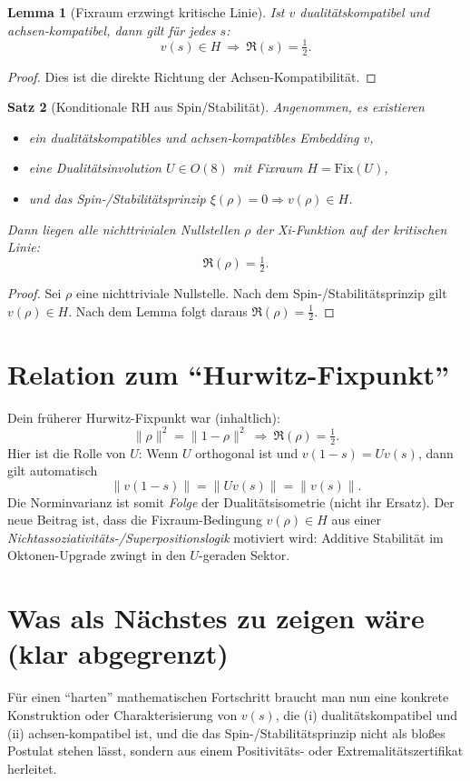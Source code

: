 \documentclass[11pt,a4paper]{article}
\newtheorem{satz}{Satz}
\newtheorem{lemma}[satz]{Lemma}
\theoremstyle{definition}
\theoremstyle{remark}
\begin{document}
	\begin{lemma}[Fixraum erzwingt kritische Linie]
		Ist $v$ dualitätskompatibel und achsen-kompatibel, dann gilt für jedes $s$:
		\[
		v(s)\in H\ \Rightarrow\ \Re(s)=\tfrac12.
		\]
	\end{lemma}
	
	\begin{proof}
		Dies ist die direkte Richtung der Achsen-Kompatibilität.
	\end{proof}
	
	\begin{satz}[Konditionale RH aus Spin/Stabilität]
		Angenommen, es existieren
		\begin{itemize}
			\item ein dualitätskompatibles und achsen-kompatibles Embedding $v$,
			\item eine Dualitätsinvolution $U\in O(8)$ mit Fixraum $H=\mathrm{Fix}(U)$,
			\item und das Spin-/Stabilitätsprinzip $\xi(\rho)=0\Rightarrow v(\rho)\in H$.
		\end{itemize}
		Dann liegen alle nichttrivialen Nullstellen $\rho$ der Xi-Funktion auf der kritischen Linie:
		\[
		\Re(\rho)=\tfrac12.
		\]
	\end{satz}
	
	\begin{proof}
		Sei $\rho$ eine nichttriviale Nullstelle. Nach dem Spin-/Stabilitätsprinzip gilt
		$v(\rho)\in H$. Nach dem Lemma folgt daraus $\Re(\rho)=\tfrac12$.
	\end{proof}
	
	\section{Relation zum ``Hurwitz-Fixpunkt''}
	Dein früherer Hurwitz-Fixpunkt war (inhaltlich):
	\[
	\| \rho\|^2=\|1-\rho\|^2\ \Rightarrow\ \Re(\rho)=\tfrac12.
	\]
	Hier ist die Rolle von $U$:
	Wenn $U$ orthogonal ist und $v(1-s)=Uv(s)$, dann gilt automatisch
	\[
	\|v(1-s)\|=\|Uv(s)\|=\|v(s)\|.
	\]
	Die Norminvarianz ist somit \emph{Folge} der Dualitätsisometrie (nicht ihr Ersatz).
	Der neue Beitrag ist, dass die Fixraum-Bedingung $v(\rho)\in H$ aus einer
	\emph{Nichtassoziativitäts-/Superpositionslogik} motiviert wird:
	Additive Stabilität im Oktonen-Upgrade zwingt in den $U$-geraden Sektor.
	
	\section{Was als Nächstes zu zeigen wäre (klar abgegrenzt)}
	Für einen ``harten'' mathematischen Fortschritt braucht man nun eine konkrete Konstruktion
	oder Charakterisierung von $v(s)$, die (i) dualitätskompatibel und (ii) achsen-kompatibel ist,
	und die das Spin-/Stabilitätsprinzip nicht als bloßes Postulat stehen lässt, sondern
	aus einem Positivitäts- oder Extremalitätszertifikat herleitet.
	
\end{document}
